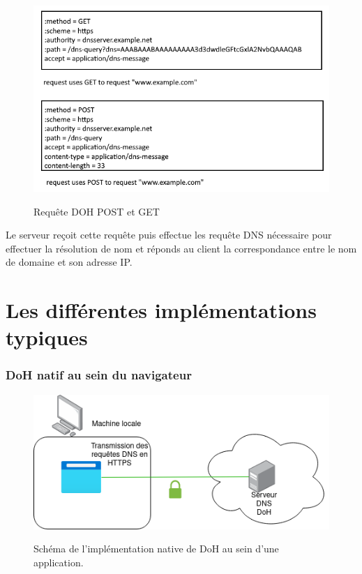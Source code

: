 \documentclass[a4paper,12pt]{article}
\begin{document}
	\begin{figure}[H]
		\begin{center}
			{\includegraphics[scale=0.5]{Images/requetedoh.png}}
						\hspace*{12pt}\hbox{\scriptsize {}}
		\end{center}
		\caption{Requête DOH POST et GET}		 
		
	\end{figure}

	Le serveur reçoit cette requête puis effectue les requête DNS nécessaire pour effectuer la résolution de nom et réponds au client la correspondance entre le nom de domaine et son adresse IP.
	
	
	\section{Les différentes implémentations typiques}
	
	\subsubsection{DoH natif au sein du navigateur}
	
	\begin{figure}[H]
		\begin{center}
			{\includegraphics[scale=0.6]{Images/schema_doh_native.png}}
		\end{center}
		\caption{Schéma de l'implémentation native de DoH au sein d'une application.}
	\end{figure}
\end{document}
